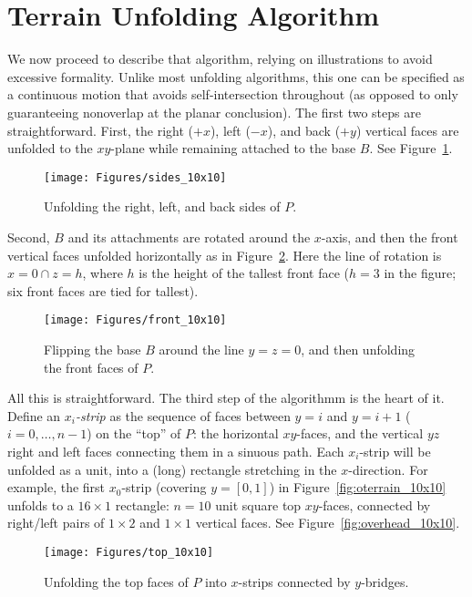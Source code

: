 \pdfoutput=1  \documentclass[]{article}
\newcommand{\figlab}[1]{\label{fig:#1}}
\newcommand{\figref}[1]{\ref{fig:#1}}
\begin{document}
\section{Terrain Unfolding Algorithm}
We now proceed to describe that algorithm, relying on illustrations to
avoid excessive formality.
Unlike most unfolding algorithms, this one can be specified as
a continuous motion that avoids self-intersection throughout 
(as opposed to only guaranteeing nonoverlap at the planar conclusion).
The first two steps are straightforward.
First, the right ($+x$), left ($-x$), and back ($+y$)
vertical faces are unfolded to the $xy$-plane 
while remaining attached to the base $B$.
See Figure~\figref{sides_10x10}.
\begin{figure}[htbp]
\centering
\texttt{[image: Figures/sides\_10x10]}
\caption{Unfolding the right, left, and back sides of $P$.}
\figlab{sides_10x10}
\end{figure}
Second, $B$ and its attachments are rotated around the $x$-axis,
and then the front vertical faces unfolded
horizontally as in
Figure~\figref{front_10x10}.
Here the line of rotation is $x=0 \cap z=h$, where $h$ is the height of
the tallest front face ($h=3$ in the figure; six front faces are tied for
tallest).
\begin{figure}[htbp]
\centering
\texttt{[image: Figures/front\_10x10]}
\caption{Flipping the base $B$ around the line $y{=}z{=}0$,
and then unfolding the front faces of $P$.}
\figlab{front_10x10}
\end{figure}


All this is straightforward.
The third step of the algorithmm is the heart of it.
Define an \emph{$x_i$-strip} as the sequence of faces between
$y=i$ and $y=i+1$ ($i=0,\ldots,n{-}1$) on the ``top'' of $P$:
the horizontal $xy$-faces, and the vertical $yz$ right and left
faces connecting them in a sinuous path.  Each $x_i$-strip will
be unfolded as a unit, into a (long) rectangle stretching in the $x$-direction.
For example, the first $x_0$-strip (covering $y=[0,1]$) in
Figure~\figref{oterrain_10x10} unfolds to
a $16{\times}1$ rectangle: $n=10$ unit square top $xy$-faces, connected by right/left
pairs of $1{\times}2$ and $1{\times}1$ vertical faces.
See Figure~\figref{overhead_10x10}.
\begin{figure}[htbp]
\centering
\texttt{[image: Figures/top\_10x10]}
\caption{Unfolding the top faces of $P$ 
into $x$-strips connected by $y$-bridges.}
\figlab{top_10x10}
\end{figure}
\end{document}
